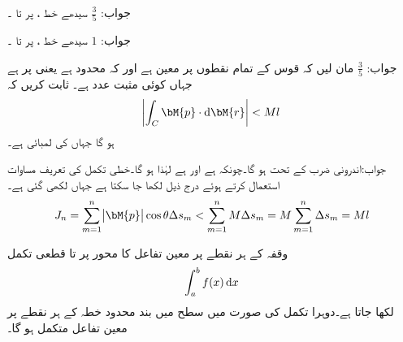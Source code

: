 جواب:\quad
$\tfrac{3}{5}$
سیدھے خط ،  پر  تا ۔

جواب:\quad
$1$
سیدھے خط ،  پر  تا ۔

جواب:\quad
$\tfrac{3}{5}$
مان لیں کہ قوس  کے تمام نقطوں  پر  معین ہے اور کہ  محدود ہے یعنی  پر  ہے جہاں  کوئی مثبت عدد ہے۔ ثابت کریں کہ 
\begin{align}
\abs{\int_C \bM{p}\cdot \dif \bM{r}} < Ml
\end{align}
ہو گا جہاں  کی لمبائی  ہے۔

جواب:اندرونی ضرب کے تحت  ہو گا۔چونکہ  ہے اور  ہے لہٰذا  ہو گا۔خطی تکمل کی تعریف مساوات  استعمال کرتے ہوئے  درج ذیل لکھا جا سکتا ہے جہاں  لکھی گئی ہے۔
\begin{align*}
J_n=\sum_{m=1}^{n} \abs{\bM{p}}\cos \theta \Delta s_m < \sum_{m=1}^{n} M \Delta s_m =M\sum_{m=1}^{n}  \Delta s_m =Ml
\end{align*}

وقفہ  کے ہر نقطے پر معین تفاعل  کا محور  پر  تا  قطعی تکمل 
\begin{align*}
\int_a^b f(x)\dif x
\end{align*}
لکھا جاتا ہے۔دوہرا تکمل کی صورت میں  سطح میں بند محدود خطہ  کے ہر نقطے پر معین تفاعل  متکمل ہو گا۔


